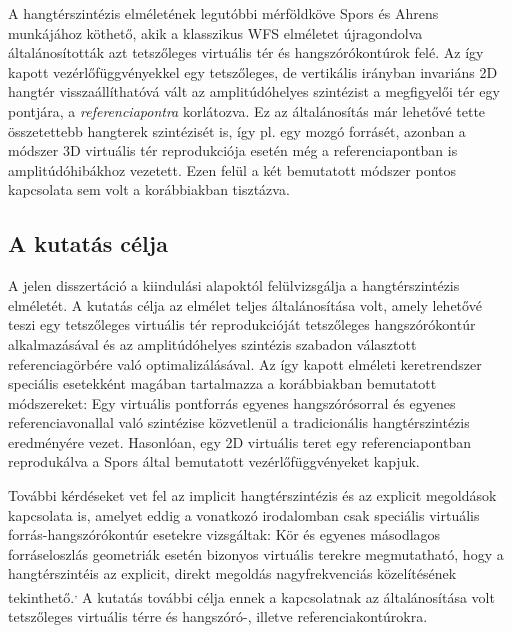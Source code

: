 \documentclass[10pt,twoside]{article}
\theoremstyle{thesisgroupstyle}
\theoremstyle{indented}
\begin{document}
A hangtérszintézis elméletének legutóbbi mérföldköve Spors és Ahrens munkájához köthető, akik a klasszikus WFS elméletet újragondolva általánosították azt tetszőleges virtuális tér és hangszórókontúrok felé.
Az így kapott vezérlőfüggvényekkel egy tetszőleges, de vertikális irányban invariáns 2D hangtér visszaállíthatóvá vált az amplitúdóhelyes szintézist a megfigyelői tér egy pontjára, a \emph{referenciapontra} korlátozva.
Ez az általánosítás már lehetővé tette összetettebb hangterek szintézisét is, így pl. egy mozgó forrásét, azonban a módszer  3D virtuális tér reprodukciója esetén még a referenciapontban is amplitúdóhibákhoz vezetett.
Ezen felül a két bemutatott módszer pontos kapcsolata sem volt a korábbiakban tisztázva.

\subsection{A kutatás célja}

A jelen disszertáció a kiindulási alapoktól felülvizsgálja a hangtérszintézis elméletét. 
A kutatás célja az elmélet teljes általánosítása volt, amely lehetővé teszi egy tetszőleges virtuális tér reprodukcióját tetszőleges hangszórókontúr alkalmazásával és az amplitúdóhelyes szintézis szabadon választott referenciagörbére való optimalizálásával.
Az így kapott elméleti keretrendszer speciális esetekként magában tartalmazza a korábbiakban bemutatott módszereket: 
Egy virtuális pontforrás egyenes hangszórósorral és egyenes referenciavonallal való szintézise közvetlenül a tradicionális hangtérszintézis eredményére vezet.
Hasonlóan, egy 2D virtuális teret egy referenciapontban reprodukálva a Spors által bemutatott vezérlőfüggvényeket kapjuk. 

További kérdéseket vet fel az implicit hangtérszintézis és az explicit megoldások kapcsolata is, amelyet eddig a vonatkozó irodalomban csak speciális virtuális forrás-hangszórókontúr esetekre vizsgáltak:
Kör és egyenes másodlagos forráseloszlás geometriák esetén bizonyos virtuális terekre megmutatható, hogy a hangtérszintéis az explicit, direkt megoldás nagyfrekvenciás közelítésének tekinthető.\textsuperscript{,}
A kutatás további célja ennek a kapcsolatnak az általánosítása volt tetszőleges virtuális térre és hangszóró-, illetve referenciakontúrokra.
\end{document}
